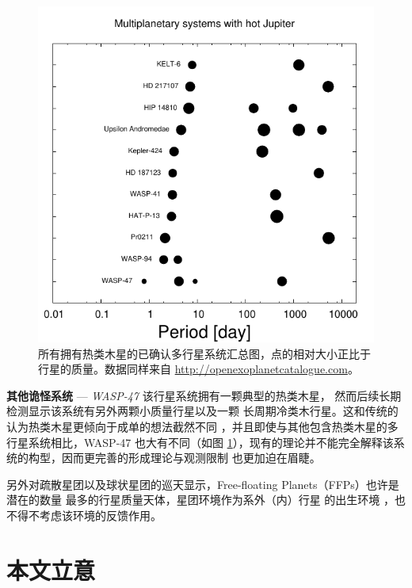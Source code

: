 \begin{figure}[h]
\centering
\includegraphics[width=1.0\textwidth]{figures/chapter1/fig14_hjmul.pdf}
\caption{所有拥有热类木星的已确认多行星系统汇总图，点的相对大小正比于行星的质量。数据同样来自 \url{http://openexoplanetcatalogue.com}。}
\label{fig:hjwcomp}
\end{figure}

\textbf{其他诡怪系统} --- \textit{WASP-47} {}  该行星系统拥有一颗典型的热类木星\cite{Hellier2012}，
然而后续长期检测显示该系统有另外两颗小质量行星\cite{Becker2015,SanchisOjeda2015}以及一颗
长周期冷类木行星\cite{NeveuVanMalle2016}。这和传统的认为热类木星更倾向于成单的想法截然不同
\cite{Steffen2012}，并且即使与其他包含热类木星的多行星系统相比，WASP-47 也大有不同（如图 
\ref{fig:hjwcomp}），现有的理论并不能完全解释该系统的构型，因而更完善的形成理论与观测限制
也更加迫在眉睫。

另外对疏散星团以及球状星团的巡天显示，Free-floating Planets（FFPs）也许是潜在的数量
最多的行星质量天体\cite{Lucas2000,Bihain2009,Sumi2011}，星团环境作为系外（内）行星
的出生环境\cite{Adams2010,Liu2013} ，也不得不考虑该环境的反馈作用。


\section{本文立意}





